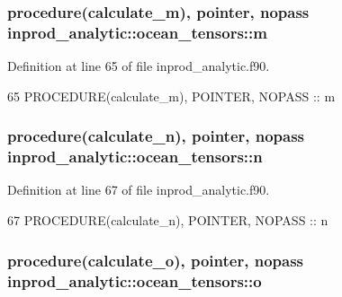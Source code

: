 \subsubsection[{\texorpdfstring{m}{m}}]{\setlength{\rightskip}{0pt plus 5cm}procedure({\bf calculate\+\_\+m}), pointer, nopass inprod\+\_\+analytic\+::ocean\+\_\+tensors\+::m\hspace{0.3cm}{\ttfamily [private]}}\hypertarget{structinprod__analytic_1_1ocean__tensors_a9f72e3b14a98a50209f86b01626f6c53}{}\label{structinprod__analytic_1_1ocean__tensors_a9f72e3b14a98a50209f86b01626f6c53}


Definition at line 65 of file inprod\+\_\+analytic.\+f90.


\begin{DoxyCode}
65      \textcolor{keywordtype}{PROCEDURE}(calculate\_m), \textcolor{keywordtype}{POINTER}, \textcolor{keywordtype}{NOPASS} :: m
\end{DoxyCode}
\subsubsection[{\texorpdfstring{n}{n}}]{\setlength{\rightskip}{0pt plus 5cm}procedure({\bf calculate\+\_\+n}), pointer, nopass inprod\+\_\+analytic\+::ocean\+\_\+tensors\+::n\hspace{0.3cm}{\ttfamily [private]}}\hypertarget{structinprod__analytic_1_1ocean__tensors_a2ccccfae8fb93871f6d7d81d90676b19}{}\label{structinprod__analytic_1_1ocean__tensors_a2ccccfae8fb93871f6d7d81d90676b19}


Definition at line 67 of file inprod\+\_\+analytic.\+f90.


\begin{DoxyCode}
67      \textcolor{keywordtype}{PROCEDURE}(calculate\_n), \textcolor{keywordtype}{POINTER}, \textcolor{keywordtype}{NOPASS} :: n
\end{DoxyCode}
\subsubsection[{\texorpdfstring{o}{o}}]{\setlength{\rightskip}{0pt plus 5cm}procedure({\bf calculate\+\_\+o}), pointer, nopass inprod\+\_\+analytic\+::ocean\+\_\+tensors\+::o\hspace{0.3cm}{\ttfamily [private]}}\hypertarget{structinprod__analytic_1_1ocean__tensors_a1002c698464fe4761ac8f0c53908c796}{}\label{structinprod__analytic_1_1ocean__tensors_a1002c698464fe4761ac8f0c53908c796}


